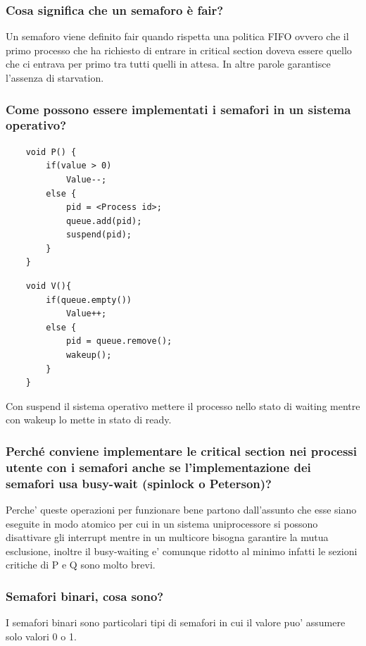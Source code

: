 \documentclass{article}
\begin{document}
\subsubsection{Cosa significa che un semaforo è fair?}
Un semaforo viene definito fair quando rispetta una politica FIFO ovvero che il
primo processo che ha richiesto di entrare in critical section doveva essere
quello che ci entrava per primo tra tutti quelli in attesa. In altre parole
garantisce l'assenza di starvation.

\subsubsection{Come possono essere implementati i semafori in un sistema operativo?}

\begin{minipage}[t]{0.48\textwidth}
    \begin{verbatim}
    void P() {
        if(value > 0)
            Value--;
        else {
            pid = <Process id>;
            queue.add(pid);
            suspend(pid);
        }
    }
\end{verbatim}
\end{minipage}%
\hfill
\begin{minipage}[t]{0.48\textwidth}
    \begin{verbatim}
    void V(){
        if(queue.empty())
            Value++;
        else {
            pid = queue.remove();
            wakeup();
        }
    }
\end{verbatim}
\end{minipage}

Con suspend il sistema operativo mettere il processo nello stato di waiting
mentre con wakeup lo mette in stato di ready.

\subsubsection{Perché conviene implementare le critical section nei processi utente con i semafori anche se l'implementazione dei semafori usa busy-wait (spinlock o Peterson)?}
Perche' queste operazioni per funzionare bene partono dall'assunto che esse
siano eseguite in modo atomico per cui in un sistema uniprocessore si possono
disattivare gli interrupt mentre in un multicore bisogna garantire la mutua
esclusione, inoltre il busy-waiting e' comunque ridotto al minimo infatti le
sezioni critiche di P e Q sono molto brevi.

\subsubsection{Semafori binari, cosa sono?}
I semafori binari sono particolari tipi di semafori in cui il valore puo'
assumere solo valori 0 o 1.
\end{document}
